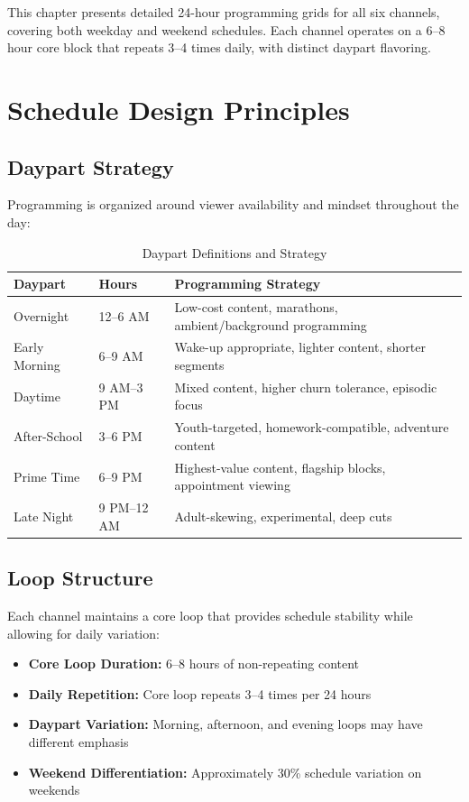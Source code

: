 \documentclass[12pt,letterpaper,twoside]{report}
\begin{document}
This chapter presents detailed 24-hour programming grids for all six channels, covering both weekday and weekend schedules. Each channel operates on a 6--8 hour core block that repeats 3--4 times daily, with distinct daypart flavoring.

\section{Schedule Design Principles}

\subsection{Daypart Strategy}

Programming is organized around viewer availability and mindset throughout the day:

\begin{table}[H]
\centering
\caption{Daypart Definitions and Strategy}
\label{tab:dayparts}
\begin{tabular}{@{}L{2.5cm}L{2.5cm}L{9cm}@{}}
\toprule
\textbf{Daypart} & \textbf{Hours} & \textbf{Programming Strategy} \\
\midrule
Overnight & 12--6 AM & Low-cost content, marathons, ambient/background programming \\
\addlinespace
Early Morning & 6--9 AM & Wake-up appropriate, lighter content, shorter segments \\
\addlinespace
Daytime & 9 AM--3 PM & Mixed content, higher churn tolerance, episodic focus \\
\addlinespace
After-School & 3--6 PM & Youth-targeted, homework-compatible, adventure content \\
\addlinespace
Prime Time & 6--9 PM & Highest-value content, flagship blocks, appointment viewing \\
\addlinespace
Late Night & 9 PM--12 AM & Adult-skewing, experimental, deep cuts \\
\bottomrule
\end{tabular}
\end{table}

\subsection{Loop Structure}

Each channel maintains a core loop that provides schedule stability while allowing for daily variation:

\begin{itemize}[leftmargin=1.5cm]
    \item \textbf{Core Loop Duration:} 6--8 hours of non-repeating content
    \item \textbf{Daily Repetition:} Core loop repeats 3--4 times per 24 hours
    \item \textbf{Daypart Variation:} Morning, afternoon, and evening loops may have different emphasis
    \item \textbf{Weekend Differentiation:} Approximately 30\% schedule variation on weekends
\end{itemize}
\end{document}
